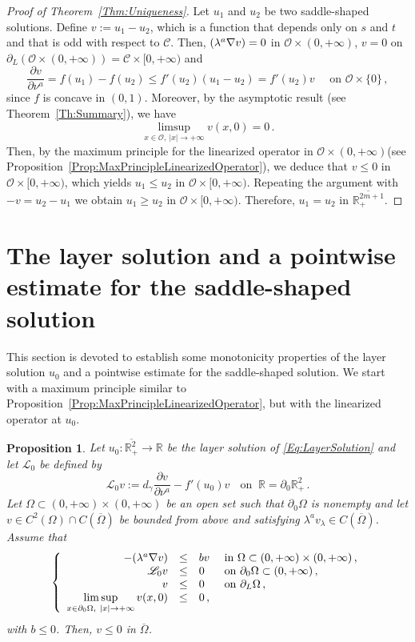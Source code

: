 \documentclass[12pt,reqno]{amsart}
\newtheorem{proposition}[theorem]{Proposition}
\theoremstyle{definition}
\theoremstyle{remark}
\newcommand{\con}[1]{\mathbb{#1}}
\newcommand{\R}{\con{R}} %
\newcommand{\ccal}{\mathscr{C}}
\newcommand{\ocal}{\mathcal{O}}
\newcommand{\s}{\gamma}
\newcommand\beqc[1]{\left\{\begin{array}{#1}}
\newcommand\eeqc{\end{array} \right.}
\def\PDEsystem{rcll}
\let\div\relax
\DeclareMathOperator{\div}{div}
\def\ds{\displaystyle}
\numberwithin{equation}{section}
\begin{document}
\begin{proof}[Proof of Theorem~\ref{Thm:Uniqueness}]
	Let $u_1$ and $u_2$ be two saddle-shaped solutions. Define $v := u_1 - u_2$, which is a function that depends only on $s$ and $t$ and that is odd with respect to $\ccal$. Then, $\div(\lambda^a \nabla v) = 0$ in $\ocal \times (0,+\infty)$, $v=0$ on $\partial_L \left( \ocal \times (0,+\infty) \right) = \ccal \times [0,+\infty)$ and
	$$
	\dfrac{\partial v}{\partial \nu^a} = f(u_1) - f(u_2) \leq f'(u_2) (u_1 - u_2) = f'(u_2) v \quad \textrm{ on } \ocal \times \{0\}\,,
	$$
	since $f$ is concave in $(0,1)$. Moreover, by the asymptotic result (see Theorem~\ref{Th:Summary}), we have
	$$
	\limsup_{x \in \ocal,\ |x|\to +\infty} v(x, 0) = 0\,.
	$$
	Then, by the maximum principle for the linearized operator in $\ocal\times (0,+\infty)$(see Proposition~\ref{Prop:MaxPrincipleLinearizedOperator}), we deduce that $v \leq 0$ in $\ocal \times [0, +\infty)$, which yields $u_1 \leq u_2$ in $\ocal \times [0, +\infty)$. Repeating the  argument with $-v = u_2 - u_1$ we obtain $u_1 \geq u_2$ in $\ocal \times [0, +\infty)$. Therefore, $u_1 = u_2$ in $\overline{\R^{2m+1}_+}$.
\end{proof}


\section{The layer solution and a pointwise estimate for the saddle-shaped solution}
\label{Sec:Layer}

This section is devoted to establish some monotonicity properties of the layer solution $u_0$ and a pointwise estimate for the saddle-shaped solution. We start with a maximum principle similar to Proposition~\ref{Prop:MaxPrincipleLinearizedOperator}, but with the linearized operator at $u_0$.

\begin{proposition}
\label{Prop:MaxPrincipleLinearizedOperator2D}
Let $u_0:\overline{\R^2_+}\to \R$ be the layer solution of \eqref{Eq:LayerSolution} and let $\mathscr{L}_0$ be defined by 
$$
\mathscr{L}_0v := d_\s \dfrac{\partial v}{\partial \nu^a}  -f'(u_0) v\,\ \ \text{ on } \ \R=\partial_0\R^2_+\,.
$$
Let $\Omega \subset (0,+\infty) \times (0,+\infty)$ be an open set such that $\partial_0 \Omega$ is nonempty and let $v \in C^2 (\Omega)\cap C(\overline{\Omega})$ be bounded from above and satisfying $\lambda^a v_\lambda \in C (\overline{\Omega})$. 
Assume that
$$
\beqc{\PDEsystem}
-\div(\lambda^a \nabla v) &\leq& b v & \text{ in } \Omega \subset (0, +\infty)\times (0,+\infty)\,, \\
\mathscr{L}_0v &\leq & 0 & \text{ on } \partial_0 \Omega \subset (0,+\infty) \,, \\
v & \leq & 0 & \text{ on } \partial_L \Omega\,,\\
\ds \limsup_{x\in \partial_0 \Omega,\ |x|\to +\infty} v(x,0) & \leq & 0\,,
\eeqc
$$
with $b \leq 0$. Then, $v\leq 0$ in $\overline{\Omega}$.
\end{proposition}
\end{document}
